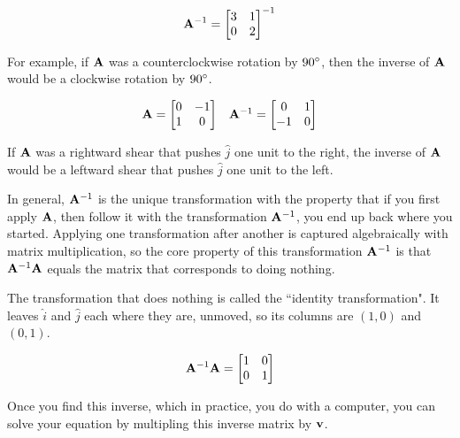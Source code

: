 \begin{equation*}
  \mathbf{A}^{-1} =
  \begin{bmatrix}
    3 & 1 \\
    0 & 2
  \end{bmatrix}^{-1}
\end{equation*}

For example, if $\mathbf{A}$ was a counterclockwise rotation by $90 \degree$, then
the inverse of $\mathbf{A}$ would be a clockwise rotation by $90 \degree$.

\begin{equation*}
  \begin{array}{cc}
  \mathbf{A} =
  \begin{bmatrix}
    0 & -1 \\
    1 & 0
  \end{bmatrix} &
  \mathbf{A}^{-1} =
  \begin{bmatrix}
    0 & 1 \\
    -1 & 0
  \end{bmatrix}
  \end{array}
\end{equation*}

If $\mathbf{A}$ was a rightward shear that pushes $\hat{j}$ one unit to the right,
the inverse of $\mathbf{A}$ would be a leftward shear that pushes $\hat{j}$ one
unit to the left.

In general, $\mathbf{A}^{-1}$ is the unique transformation with the property that
if you first apply $\mathbf{A}$, then follow it with the transformation
$\mathbf{A}^{-1}$, you end up back where you started. Applying one transformation
after another is captured algebraically with matrix multiplication, so the core
property of this transformation $\mathbf{A}^{-1}$ is that $\mathbf{A}^{-1}\mathbf{A}$
equals the matrix that corresponds to doing nothing.

The transformation that does nothing is called the ``identity transformation".
It leaves $\hat{i}$ and $\hat{j}$ each where they are, unmoved, so its columns
are $(1, 0)$ and $(0, 1)$.

\begin{equation*}
  \mathbf{A}^{-1}\mathbf{A} =
  \begin{bmatrix}
    1 & 0 \\
    0 & 1
  \end{bmatrix}
\end{equation*}

Once you find this inverse, which in practice, you do with a computer, you can
solve your equation by multipling this inverse matrix by $\mathbf{v}$.


